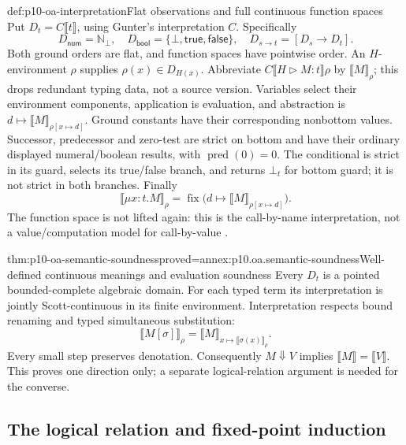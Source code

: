 \begin{hbdefinition}{def:p10-oa-interpretation}{Flat observations and full continuous function spaces}
Put \(D_t=C\llbracket t\rrbracket\), using Gunter's interpretation
\(C\). Specifically
\[
 D_{\mathsf{num}}=\mathbb N_{\bot},\quad
 D_{\mathsf{bool}}=\{\bot,\mathsf{true},\mathsf{false}\},\quad
 D_{s\to t}=[D_s\longrightarrow D_t].
\]
Both ground orders are flat, and function spaces have pointwise order.
An \(H\)-environment \(\rho\) supplies \(\rho(x)\in D_{H(x)}\).
Abbreviate \(C\llbracket H\triangleright M:t\rrbracket\rho\) by
\(\llbracket M\rrbracket_\rho\); this drops redundant typing data,
not a source version. Variables select their environment components,
application is evaluation, and abstraction is
\(d\mapsto\llbracket M\rrbracket_{\rho[x\mapsto d]}\).
Ground constants have their corresponding nonbottom values.
Successor, predecessor and zero-test are strict on bottom and have
their ordinary displayed numeral/boolean results, with
\(\operatorname{pred}(0)=0\).
The conditional is strict in its guard, selects its true/false branch,
and returns \(\bot_t\) for bottom guard; it is not strict in both
branches. Finally
\[
 \llbracket\mu x:t.M\rrbracket_\rho
 =\operatorname{fix}\bigl(d\mapsto
                    \llbracket M\rrbracket_{\rho[x\mapsto d]}\bigr).
\]
The function space is not lifted again: this is the call-by-name
interpretation, not a value/computation model for call-by-value
\cite[pp.~34--35]{Gunter1994TypesAuthorOA}.
\end{hbdefinition}

\begin{hbtheorem}{thm:p10-oa-semantic-soundness}{proved=annex:p10.oa.semantic-soundness}{Well-defined continuous meanings and evaluation soundness}
Every \(D_t\) is a pointed bounded-complete algebraic domain.
For each typed term its interpretation is jointly Scott-continuous in
its finite environment. Interpretation respects bound renaming and
typed simultaneous substitution:
\[
 \llbracket M[\sigma]\rrbracket_\rho
   =\llbracket M\rrbracket_{x\mapsto\llbracket\sigma(x)\rrbracket_\rho}.
\]
Every small step preserves denotation. Consequently
\(M\Downarrow V\) implies \(\llbracket M\rrbracket=\llbracket V\rrbracket\).
This proves one direction only; a separate logical-relation argument
is needed for the converse.
\end{hbtheorem}

\subsection{The logical relation and fixed-point induction}

